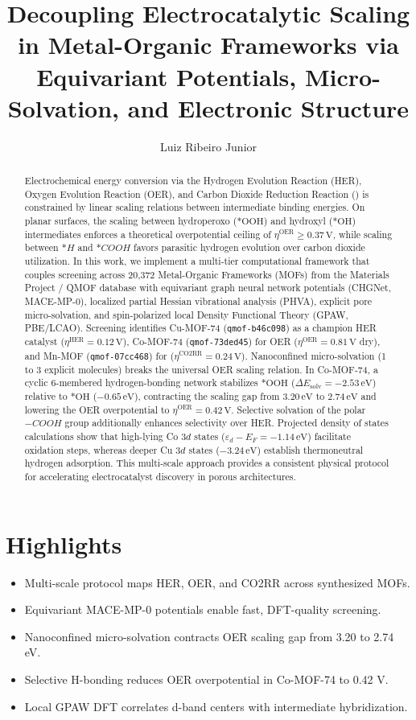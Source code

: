 \documentclass[journal=jacsat,manuscript=article]{achemso}
\author{Luiz Ribeiro Junior}
\affiliation{Laboratory for Advanced Computational Materials and Molecular Modeling}
\title{Decoupling Electrocatalytic Scaling in Metal-Organic Frameworks via Equivariant Potentials, Micro-Solvation, and Electronic Structure}
\begin{document}
\begin{abstract}
Electrochemical energy conversion via the Hydrogen Evolution Reaction (HER), Oxygen Evolution Reaction (OER), and Carbon Dioxide Reduction Reaction () is constrained by linear scaling relations between intermediate binding energies. On planar surfaces, the scaling between hydroperoxo ($*\text{OOH}$) and hydroxyl ($*\text{OH}$) intermediates enforces a theoretical overpotential ceiling of $\eta^{\text{OER}} \ge 0.37\,\text{V}$, while scaling between $*H$ and $*COOH$ favors parasitic hydrogen evolution over carbon dioxide utilization. In this work, we implement a multi-tier computational framework that couples screening across 20,372 Metal-Organic Frameworks (MOFs) from the Materials Project / QMOF database with equivariant graph neural network potentials (CHGNet, MACE-MP-0), localized partial Hessian vibrational analysis (PHVA), explicit pore micro-solvation, and spin-polarized local Density Functional Theory (GPAW, PBE/LCAO). Screening identifies Cu-MOF-74 (\texttt{qmof-b46c098}) as a champion HER catalyst ($\eta^{\text{HER}} = 0.12\,\text{V}$), Co-MOF-74 (\texttt{qmof-73ded45}) for OER ($\eta^{\text{OER}} = 0.81\,\text{V}$ dry), and Mn-MOF (\texttt{qmof-07cc468}) for  ($\eta^{\text{CO2RR}} = 0.24\,\text{V}$). Nanoconfined micro-solvation (1 to 3 explicit  molecules) breaks the universal OER scaling relation. In Co-MOF-74, a cyclic 6-membered hydrogen-bonding network stabilizes $*\text{OOH}$ ($\Delta E_{\text{solv}} = -2.53\,\text{eV}$) relative to $*\text{OH}$ ($-0.65\,\text{eV}$), contracting the scaling gap from $3.20\,\text{eV}$ to $2.74\,\text{eV}$ and lowering the OER overpotential to $\eta^{\text{OER}} = 0.42\,\text{V}$. Selective solvation of the polar $-COOH$ group additionally enhances  selectivity over HER. Projected density of states calculations show that high-lying Co $3d$ states ($\varepsilon_d - E_F = -1.14\,\text{eV}$) facilitate oxidation steps, whereas deeper Cu $3d$ states ($-3.24\,\text{eV}$) establish thermoneutral hydrogen adsorption. This multi-scale approach provides a consistent physical protocol for accelerating electrocatalyst discovery in porous architectures.
\end{abstract}

\section*{Highlights}
\begin{itemize}
    \item Multi-scale protocol maps HER, OER, and CO2RR across synthesized MOFs.
    \item Equivariant MACE-MP-0 potentials enable fast, DFT-quality screening.
    \item Nanoconfined micro-solvation contracts OER scaling gap from 3.20 to 2.74 eV.
    \item Selective H-bonding reduces OER overpotential in Co-MOF-74 to 0.42 V.
    \item Local GPAW DFT correlates d-band centers with intermediate hybridization.
\end{itemize}
\end{document}
